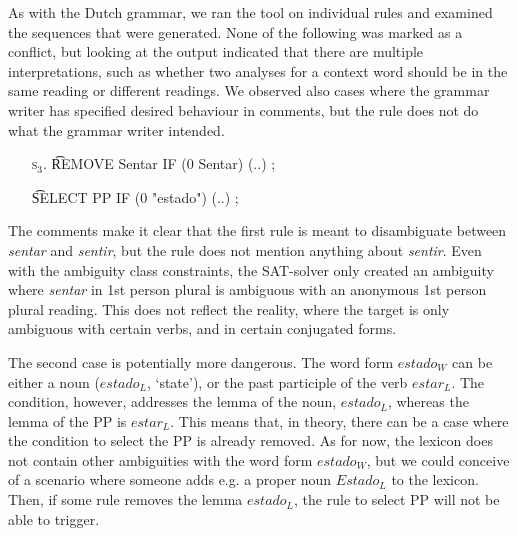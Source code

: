 {{As with the Dutch grammar, we ran the tool on individual rules and
examined the sequences that were generated. None of the following was
marked as a conflict, but looking at the output indicated that there
are multiple interpretations, such as whether two analyses for a
context word should be in the same reading or different readings.
We observed also cases where the grammar writer has specified desired
behaviour in comments, but the rule does not do what the grammar
writer intended. 

\begin{itemize}
\item[\textsc{s$_3$.}] \t{REMOVE Sentar IF (0 Sentar) (..) ;}
\item[] \t{SELECT PP IF (0 "estado") (..) ;}
\end{itemize}

The comments make it clear that the first rule is meant to
disambiguate between \emph{sentar} and \emph{sentir}, but the rule
does not mention anything about \emph{sentir}.  Even with the
ambiguity class constraints, the SAT-solver only created an ambiguity
where \emph{sentar} in 1st person plural is ambiguous with an
anonymous 1st person plural reading.  This does not reflect the
reality, where the target is only ambiguous with certain verbs, and in
certain conjugated forms.

The second case is potentially more dangerous.  The word form
$estado_{W}$ can be either a noun ($estado_{L}$, `state'), or the past
participle of the verb $estar_{L}$.  The condition, however, addresses
the lemma of the noun, $estado_L$, whereas the lemma of the PP is
$estar_{L}$.  This means that, in theory, there can be a case where
the condition to select the PP is already removed. As for now, the
lexicon does not contain other ambiguities with the word form
$estado_{W}$, but we could conceive of a scenario where someone adds
e.g. a proper noun $Estado_{L}$ to the lexicon. Then, if some rule
removes the lemma $estado_{L}$, the rule to select PP will not be able
to trigger.





}}
